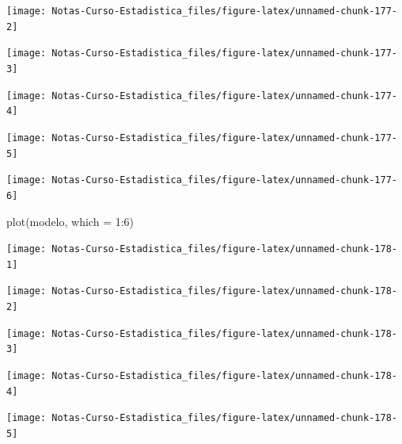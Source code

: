\documentclass[
  12pt,
]{book}
\newenvironment{Shaded}{\begin{snugshade}}{\end{snugshade}}
\newcommand{\AttributeTok}[1]{\textcolor[rgb]{0.77,0.63,0.00}{#1}}
\newcommand{\DecValTok}[1]{\textcolor[rgb]{0.00,0.00,0.81}{#1}}
\newcommand{\FunctionTok}[1]{\textcolor[rgb]{0.00,0.00,0.00}{#1}}
\newcommand{\NormalTok}[1]{#1}
\newcommand{\SpecialCharTok}[1]{\textcolor[rgb]{0.00,0.00,0.00}{#1}}
\begin{document}
\begin{center}\texttt{[image: Notas-Curso-Estadistica\_files/figure-latex/unnamed-chunk-177-2]} \end{center}

\begin{center}\texttt{[image: Notas-Curso-Estadistica\_files/figure-latex/unnamed-chunk-177-3]} \end{center}

\begin{center}\texttt{[image: Notas-Curso-Estadistica\_files/figure-latex/unnamed-chunk-177-4]} \end{center}

\begin{center}\texttt{[image: Notas-Curso-Estadistica\_files/figure-latex/unnamed-chunk-177-5]} \end{center}

\begin{center}\texttt{[image: Notas-Curso-Estadistica\_files/figure-latex/unnamed-chunk-177-6]} \end{center}

\begin{Shaded}
\begin{Highlighting}[]
\FunctionTok{plot}\NormalTok{(modelo, }\AttributeTok{which =} \DecValTok{1}\SpecialCharTok{:}\DecValTok{6}\NormalTok{)}
\end{Highlighting}
\end{Shaded}

\begin{center}\texttt{[image: Notas-Curso-Estadistica\_files/figure-latex/unnamed-chunk-178-1]} \end{center}

\begin{center}\texttt{[image: Notas-Curso-Estadistica\_files/figure-latex/unnamed-chunk-178-2]} \end{center}

\begin{center}\texttt{[image: Notas-Curso-Estadistica\_files/figure-latex/unnamed-chunk-178-3]} \end{center}

\begin{center}\texttt{[image: Notas-Curso-Estadistica\_files/figure-latex/unnamed-chunk-178-4]} \end{center}

\begin{center}\texttt{[image: Notas-Curso-Estadistica\_files/figure-latex/unnamed-chunk-178-5]} \end{center}
\end{document}
